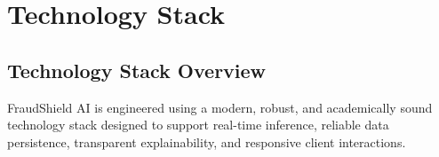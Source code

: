 \chapter{Technology Stack}
\label{chap:technology_stack}

\section{Technology Stack Overview}
FraudShield AI is engineered using a modern, robust, and academically sound technology stack designed to support real-time inference, reliable data persistence, transparent explainability, and responsive client interactions.

